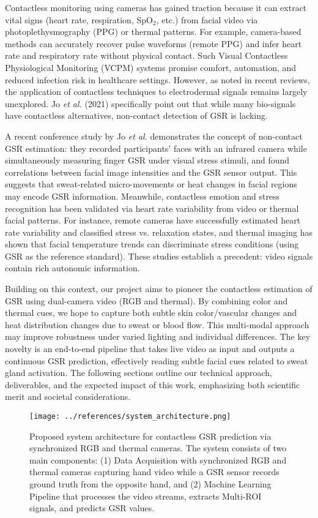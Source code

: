 \documentclass[12pt]{article}
\begin{document}
    Contactless monitoring using cameras has gained traction because it can extract vital signs (heart rate, respiration, SpO$_2$, etc.) from facial video via photoplethysmography (PPG) or thermal patterns. For example, camera-based methods can accurately recover pulse waveforms (remote PPG) and infer heart rate and respiratory rate without physical contact. Such Visual Contactless Physiological Monitoring (VCPM) systems promise comfort, automation, and reduced infection risk in healthcare settings. However, as noted in recent reviews, the application of contactless techniques to electrodermal signals remains largely unexplored. Jo \emph{et al.} (2021) specifically point out that while many bio-signals have contactless alternatives, non-contact detection of GSR is lacking.

    A recent conference study by Jo \emph{et al.} demonstrates the concept of non-contact GSR estimation: they recorded participants' faces with an infrared camera while simultaneously measuring finger GSR under visual stress stimuli, and found correlations between facial image intensities and the GSR sensor output. This suggests that sweat-related micro-movements or heat changes in facial regions may encode GSR information. Meanwhile, contactless emotion and stress recognition has been validated via heart rate variability from video or thermal facial patterns. For instance, remote cameras have successfully estimated heart rate variability and classified stress vs. relaxation states, and thermal imaging has shown that facial temperature trends can discriminate stress conditions (using GSR as the reference standard). These studies establish a precedent: video signals contain rich autonomic information.

    Building on this context, our project aims to pioneer the contactless estimation of GSR using dual-camera video (RGB and thermal). By combining color and thermal cues, we hope to capture both subtle skin color/vascular changes and heat distribution changes due to sweat or blood flow. This multi-modal approach may improve robustness under varied lighting and individual differences. The key novelty is an end-to-end pipeline that takes live video as input and outputs a continuous GSR prediction, effectively reading subtle facial cues related to sweat gland activation. The following sections outline our technical approach, deliverables, and the expected impact of this work, emphasizing both scientific merit and societal considerations.

    \begin{figure}[ht]
        \centering
        \texttt{[image: ../references/system\_architecture.png]}
        \caption{Proposed system architecture for contactless GSR prediction via synchronized RGB and thermal cameras. The system consists of two main components: (1) Data Acquisition with synchronized RGB and thermal cameras capturing hand video while a GSR sensor records ground truth from the opposite hand, and (2) Machine Learning Pipeline that processes the video streams, extracts Multi-ROI signals, and predicts GSR values.}
        \label{fig:architecture}
    \end{figure}
\end{document}
